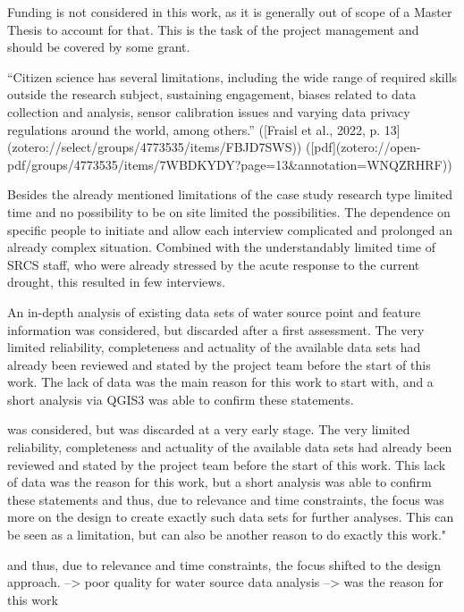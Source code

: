 Funding is not considered in this work, as it is generally out of scope of a Master Thesis to account for that. This is the task of the project management and should be covered by some grant.



“Citizen science has several limitations, including the wide range of required skills outside the research subject, sustaining engagement, biases related to data collection and analysis, sensor calibration issues and varying data privacy regulations around the world, among others.” ([Fraisl et al., 2022, p. 13](zotero://select/groups/4773535/items/FBJD7SWS)) ([pdf](zotero://open-pdf/groups/4773535/items/7WBDKYDY?page=13&annotation=WNQZRHRF))

Besides the already mentioned limitations of the case study research type limited time and no possibility to be on site limited the possibilities. The dependence on specific people to initiate and allow each interview complicated and prolonged an already complex situation. Combined with the understandably limited time of SRCS staff, who were already stressed by the acute response to the current drought, this resulted in few interviews.

An in-depth analysis of existing data sets of water source point and feature information was considered, but  discarded after a first assessment. The very limited reliability, completeness and actuality of the available data sets had already been reviewed and stated by the project team before the start of this work. The lack of data was the main reason for this work to start with, and a short analysis via QGIS3 was able to confirm these statements. 

was considered, but was discarded at a very early stage. The very limited reliability, completeness and actuality of the available data sets had already been reviewed and stated by the project team before the start of this work. This lack of data was the reason for this work, but a short analysis was able to confirm these statements and thus, due to relevance and time constraints, 
the focus was more on the design to create exactly such data sets for further analyses. This can be seen as a limitation, but can also be another reason to do exactly this work."

and thus, due to relevance and time constraints, the focus shifted to the design approach.
--> poor quality for water source data analysis --> was the reason for this work %



